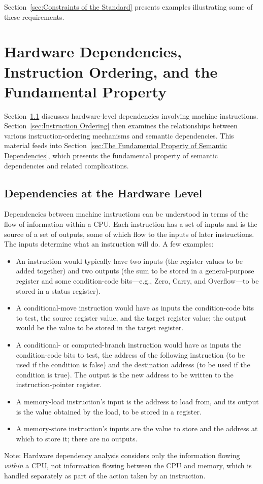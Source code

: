 \documentclass[10]{article}
\begin{document}
Section~\ref{sec:Constraints of the Standard}
presents examples illustrating some of these requirements.

\section{Hardware Dependencies, Instruction Ordering, and the
Fundamental Property}
\label{sec:Hardware Dependencies, Instruction Ordering, and the
Fundamental Property}

Section~\ref{sec:Dependencies at the Hardware Level}
discusses hardware-level dependencies involving machine instructions.
Section~\ref{sec:Instruction Ordering}
then examines the relationships between various instruction-ordering
mechanisms and semantic dependencies.
This material feeds into
Section~\ref{sec:The Fundamental Property of Semantic Dependencies},
which presents the fundamental property of semantic dependencies
and related complications.

\subsection{Dependencies at the Hardware Level}
\label{sec:Dependencies at the Hardware Level}

Dependencies between machine instructions can be understood in terms
of the flow of information within a CPU.
Each instruction has a set of inputs and is the source of a set of outputs,
some of which flow to the inputs of later instructions.
The inputs determine what an instruction will do.
A few examples:
\begin{itemize}
\item	An  instruction would typically have two inputs
	(the register values to be added together) and two outputs
	(the sum to be stored in a general-purpose register and some
	condition-code bits---e.g., Zero, Carry, and Overflow---to be
	stored in a status register).
\item	A conditional-move instruction would have as inputs the
	condition-code bits to test, the source register value, and the
	target register value; the output would be the value to be stored
	in the target register.
\item	A conditional- or computed-branch instruction would have as inputs
	the condition-code bits to test, the address of the following
	instruction (to be used if the condition is false) and the
	destination address (to be used if the condition is true).
	The output is the new address to be written to the
	instruction-pointer register.
\item	A memory-load instruction's input is the address to load from,
	and its output is the value obtained by the load, to be stored
	in a register.
\item	A memory-store instruction's inputs are the value to store and
	the address at which to store it; there are no outputs.
\end{itemize}
Note: Hardware dependency analysis considers only the information
flowing \emph{within} a CPU, not information flowing between the
CPU and memory, which is handled separately as part of the action
taken by an instruction.
\end{document}
